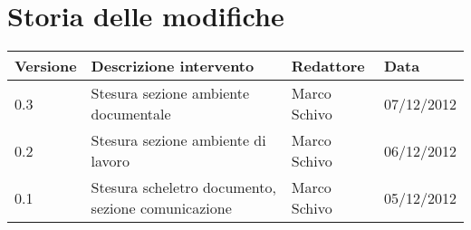 %

\newcommand{\docName}{Norme di Progetto}
\newcommand{\docFileName}{Norme di Progetto}
\newcommand{\docVers}{1.0}
\newcommand{\creationDate}{05/12/2012}
\newcommand{\modificationDate}{05/12/2012}
\newcommand{\docState}{Non approvato}
\newcommand{\docUsage}{Interno}
\newcommand{\docAuthors}{Marco Schivo}
\newcommand{\approvedBy}{}
\newcommand{\verifiedBy}{}
\newcommand{\docRoot}{..}







\section*{Storia delle modifiche}
\begin{tabularx}{\textwidth}{lXll}
\toprule
Versione & Descrizione intervento & Redattore & Data\\
\midrule %
0.3 & Stesura sezione ambiente documentale & Marco Schivo & 07/12/2012\\
0.2 & Stesura sezione ambiente di lavoro & Marco Schivo & 06/12/2012\\
0.1 & Stesura scheletro documento, sezione comunicazione & Marco Schivo & 05/12/2012\\
\bottomrule
\end{tabularx}
\newpage

